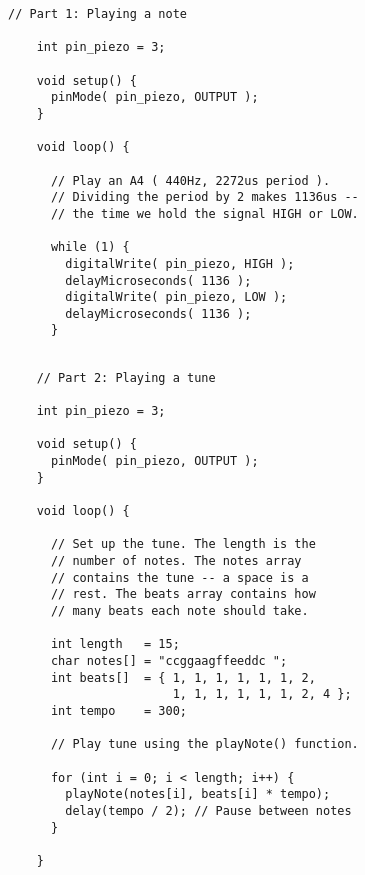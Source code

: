 \begin{minipage}[t]{0.49\tw}
  \vspace{0.1in}
  \begin{Verbatim}[gobble=3,fontsize=\small]
    // Part 1: Playing a note

    int pin_piezo = 3;

    void setup() {
      pinMode( pin_piezo, OUTPUT );
    }

    void loop() {

      // Play an A4 ( 440Hz, 2272us period ).
      // Dividing the period by 2 makes 1136us --
      // the time we hold the signal HIGH or LOW.

      while (1) {
        digitalWrite( pin_piezo, HIGH );
        delayMicroseconds( 1136 );
        digitalWrite( pin_piezo, LOW );
        delayMicroseconds( 1136 );
      }

  \end{Verbatim}
  \vspace{0.1in}
  \begin{Verbatim}[gobble=3,fontsize=\small]

    // Part 2: Playing a tune

    int pin_piezo = 3;

    void setup() {
      pinMode( pin_piezo, OUTPUT );
    }

    void loop() {

      // Set up the tune. The length is the
      // number of notes. The notes array
      // contains the tune -- a space is a
      // rest. The beats array contains how
      // many beats each note should take.

      int length   = 15;
      char notes[] = "ccggaagffeeddc ";
      int beats[]  = { 1, 1, 1, 1, 1, 1, 2,
                       1, 1, 1, 1, 1, 1, 2, 4 };
      int tempo    = 300;

      // Play tune using the playNote() function.

      for (int i = 0; i < length; i++) {
        playNote(notes[i], beats[i] * tempo);
        delay(tempo / 2); // Pause between notes
      }

    }

  \end{Verbatim}
\end{minipage}
\vspace{0.1in}

